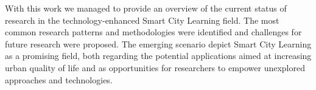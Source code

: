 With this work we managed to provide an overview of the current status of research in the technology-enhanced Smart City Learning field.
The most common research patterns and methodologies were identified and challenges for future research were proposed.
The emerging scenario depict Smart City Learning as a promising field, both regarding the potential applications aimed at increasing urban quality of life and as opportunities for researchers to empower unexplored approaches and technologies.